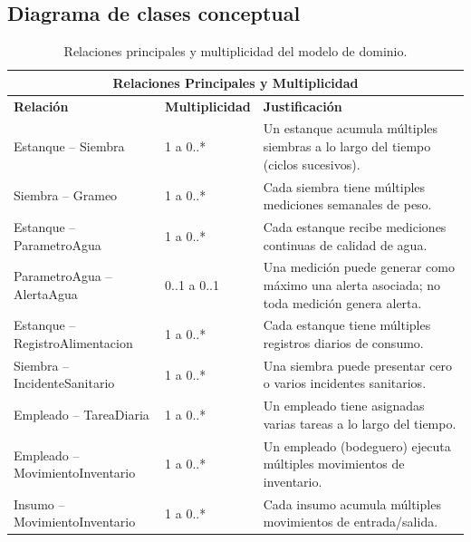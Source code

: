 \documentclass[11pt,a4paper]{article}
\begin{document}
\subsection{Diagrama de clases conceptual}

\begin{longtable}{|p{6cm}|p{3cm}|p{6cm}|}
\caption{Relaciones principales y multiplicidad del modelo de dominio.}
\label{tab:relaciones-multiplicidad} \\
\hline

\multicolumn{3}{|c|}{\textbf{Relaciones Principales y Multiplicidad}} \\ \hline

\textbf{Relación} & \textbf{Multiplicidad} & \textbf{Justificación} \\ \hline

Estanque -- Siembra & 1 a 0..* &
Un estanque acumula múltiples siembras a lo largo del tiempo (ciclos sucesivos). \\ \hline

Siembra -- Grameo & 1 a 0..* &
Cada siembra tiene múltiples mediciones semanales de peso. \\ \hline

Estanque -- ParametroAgua & 1 a 0..* &
Cada estanque recibe mediciones continuas de calidad de agua. \\ \hline

ParametroAgua -- AlertaAgua & 0..1 a 0..1 &
Una medición puede generar como máximo una alerta asociada; no toda medición genera alerta. \\ \hline

Estanque -- RegistroAlimentacion & 1 a 0..* &
Cada estanque tiene múltiples registros diarios de consumo. \\ \hline

Siembra -- IncidenteSanitario & 1 a 0..* &
Una siembra puede presentar cero o varios incidentes sanitarios. \\ \hline

Empleado -- TareaDiaria & 1 a 0..* &
Un empleado tiene asignadas varias tareas a lo largo del tiempo. \\ \hline

Empleado -- MovimientoInventario & 1 a 0..* &
Un empleado (bodeguero) ejecuta múltiples movimientos de inventario. \\ \hline

Insumo -- MovimientoInventario & 1 a 0..* &
Cada insumo acumula múltiples movimientos de entrada/salida. \\ \hline


\end{longtable}
\end{document}
